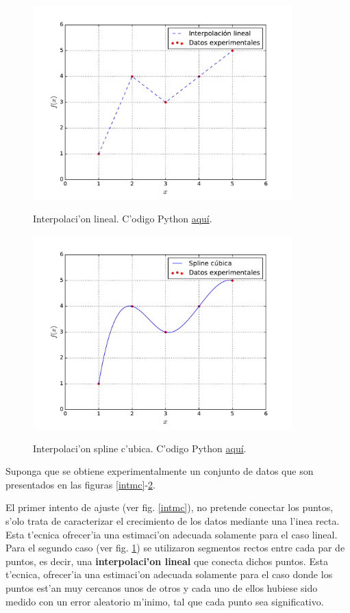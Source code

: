 \begin{figure}[h!]
\begin{center}
\includegraphics[width=10cm]{figs/fig-int-lineal.pdf}\label{intil}
\caption{Interpolaci'on lineal. C'odigo Python \href{https://github.com/gfrubi/Lab/blob/master/python/fig-int-lineal.py}{aqu\'i}.}
\end{center}
\end{figure}

\begin{figure}[h!]
\begin{center}
\includegraphics[width=10cm]{figs/fig-int-curv.pdf}\label{intic}
\caption{Interpolaci'on spline c'ubica. C'odigo Python  \href{https://github.com/gfrubi/Lab/blob/master/python/fig-int-curv.py}{aqu\'i}.}
\end{center}
\end{figure}

Suponga que se obtiene experimentalmente un conjunto de datos que son presentados en las figuras \ref{intmc}-\ref{intic}.

El primer intento de ajuste (ver fig. \ref{intmc}), no pretende conectar los puntos, s'olo trata de caracterizar el crecimiento de los datos mediante una l'inea recta. Esta t'ecnica ofrecer'ia una estimaci'on adecuada solamente para el caso lineal. Para el segundo caso (ver fig. \ref{intil}) se utilizaron segmentos rectos entre cada par de puntos, es decir, una \textbf{interpolaci'on lineal} que conecta dichos puntos.  Esta t'ecnica, ofrecer'ia una estimaci'on adecuada solamente para el caso donde los puntos est'an muy cercanos unos de otros y cada uno de ellos hubiese sido medido con un error aleatorio m'inimo, tal que cada punto sea significativo.

